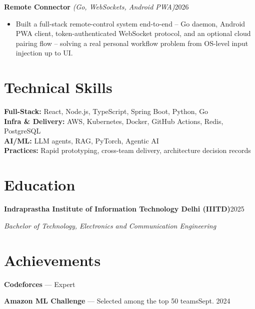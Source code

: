 \documentclass[10pt,letterpaper]{article}
\newcommand{\resumeHeading}[4]{%
  \par\noindent\textbf{#1}\hfill\mbox{#2}\par
  \noindent\textit{#3}\hfill\mbox{\textit{#4}}\par
}
\newcommand{\projectHeading}[3]{%
  \par\noindent\textbf{#1} \textit{(#2)}\hfill\mbox{#3}\par
}
\begin{document}
\projectHeading{Remote Connector}{Go, WebSockets, Android PWA}{2026}
\begin{itemize}
\item Built a full-stack remote-control system end-to-end -- Go daemon, Android PWA client, token-authenticated WebSocket protocol, and an optional cloud pairing flow -- solving a real personal workflow problem from OS-level input injection up to UI.
\end{itemize}

\section{Technical Skills}
\textbf{Full-Stack:} React, Node.js, TypeScript, Spring Boot, Python, Go \\[-1pt]
\textbf{Infra \& Delivery:} AWS, Kubernetes, Docker, GitHub Actions, Redis, PostgreSQL \\[-1pt]
\textbf{AI/ML:} LLM agents, RAG, PyTorch, Agentic AI \\[-1pt]
\textbf{Practices:} Rapid prototyping, cross-team delivery, architecture decision records \\[-1pt]

\section{Education}
\resumeHeading
  {Indraprastha Institute of Information Technology Delhi (IIITD)}
  {2025}
  {Bachelor of Technology, Electronics and Communication Engineering}
  {}

\section{Achievements}
\textbf{Codeforces} --- Expert \par
\textbf{Amazon ML Challenge} --- Selected among the top 50 teams\hfill Sept. 2024\par
\end{document}
